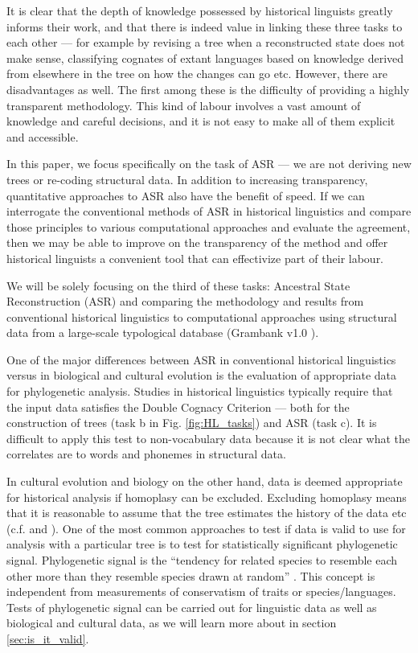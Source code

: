 \documentclass[12pt,letterpaper]{article}
\begin{document}
It is clear that the depth of knowledge possessed by historical linguists greatly informs their work, and that there is indeed value in linking these three tasks to each other --- for example by revising a tree when a reconstructed state does not make sense, classifying cognates of extant languages based on knowledge derived from elsewhere in the tree on how the changes can go etc. However, there are disadvantages as well. The first among these is the difficulty of providing a highly transparent methodology. This kind of labour involves a vast amount of knowledge and careful decisions, and it is not easy to make all of them explicit and accessible. 

In this paper, we focus specifically on the task of ASR --- we are not deriving new trees or re-coding structural data. In addition to increasing transparency, quantitative approaches to ASR also have the benefit of speed. If we can interrogate the conventional methods of ASR in historical linguistics and compare those principles to various computational approaches and evaluate the agreement, then we may be able to improve on the transparency of the method and offer historical linguists a convenient tool that can effectivize part of their labour.

We will be solely focusing on the third of these tasks: Ancestral State Reconstruction (ASR) and comparing the methodology and results from conventional historical linguistics to computational approaches using structural data from a large-scale typological database (Grambank v1.0 \citet{grambank_release}). 

One of the major differences between ASR in conventional historical linguistics versus in biological and cultural evolution is the evaluation of appropriate data for phylogenetic analysis. Studies in historical linguistics typically require that the input data satisfies the Double Cognacy Criterion \citep{walkden_2013} --- both for the construction of trees (task b in Fig. \ref{fig:HL_tasks}) and ASR (task c). It is difficult to apply this test to non-vocabulary data because it is not clear what the correlates are to words and phonemes in structural data. 

In cultural evolution and biology on the other hand, data is deemed appropriate for historical analysis if homoplasy can be excluded. Excluding homoplasy means that it is reasonable to assume that the tree estimates the history of the data etc (c.f. \citet{holland2020accuracy} and \citet{evans2021uses}). One of the most common approaches to test if data is valid to use for analysis with a particular tree is to test for statistically significant phylogenetic signal. Phylogenetic signal is the ``tendency for related species to resemble each other more than they resemble species drawn at random'' \citep[905]{blomberg2002tempo}. This concept is independent from measurements of conservatism of traits or species/languages. Tests of phylogenetic signal can be carried out for linguistic data as well as biological and cultural data, as we will learn more about in section \ref{sec:is_it_valid}.
\end{document}
